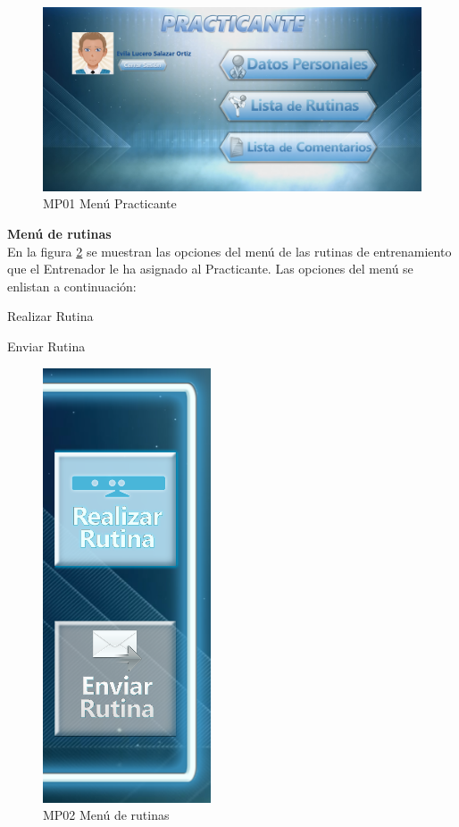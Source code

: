 \begin{figure}[H]
	\centering
		\includegraphics[scale=0.5]{./Figuras/Menus/MP01Menu_Practicante}
	\caption{MP01 Menú Practicante}
	\label{menu:MP01}
\end{figure}
	
\textbf{\textcolor[rgb]{0, 0, 0.545098}{Menú de rutinas}} \\

En la figura \ref{menu:MP02} se muestran las opciones del menú de las rutinas de entrenamiento que el Entrenador le ha asignado al Practicante. Las opciones del menú se enlistan a continuación: \\

\begin{compactitem} 
	\setlength\itemsep{-0.25em}
	\item Realizar Rutina
	\item Enviar Rutina
\end{compactitem} 

\begin{figure}[H]
	\centering
		\includegraphics[scale=0.5]{./Figuras/Menus/MP02Menu_rutinas}
	\caption{MP02 Menú de rutinas}
	\label{menu:MP02}
\end{figure}

